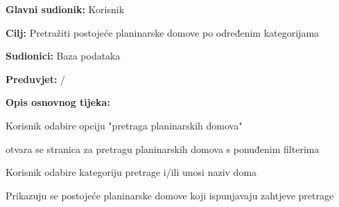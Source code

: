 			\noindent {}
		\begin{packed_item}
			
			\item \textbf{Glavni sudionik: }$ $Korisnik$ $
			\item  \textbf{Cilj:} $ $Pretražiti postojeće planinarske domove po određenim kategorijama $ $
			\item  \textbf{Sudionici:} $ $Baza podataka$ $
			\item  \textbf{Preduvjet:} $ $/$ $
			\item  \textbf{Opis osnovnog tijeka:}
			
			\item[] \begin{packed_enum}
				
				\item $ $Korisnik odabire opciju "pretraga planinarskih domova"$ $
				\item $ $otvara se stranica za pretragu planinarskih domova s ponuđenim filterima$ $
				\item $ $Korisnik odabire kategoriju pretrage i/ili unosi naziv doma $ $
				\item $ $Prikazuju se postojeće planinarske domove koji ispunjavaju zahtjeve pretrage$ $
				
			\end{packed_enum}
		\end{packed_item}
	
